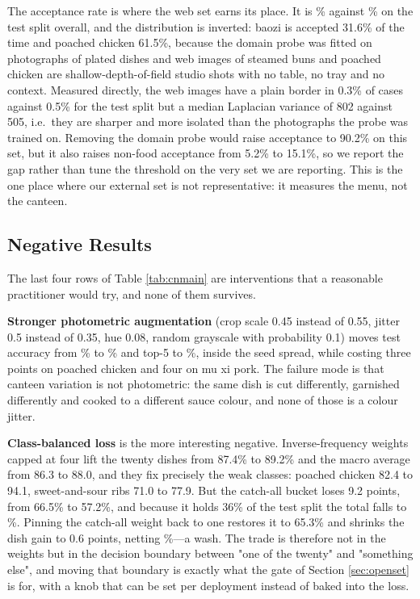 \documentclass[conference]{IEEEtran}
\begin{document}
The acceptance rate is where the web set earns its place. It is \webAccept\%
against \gateIn\% on the test split overall, and the distribution is inverted:
baozi is
accepted 31.6\% of the time and poached chicken 61.5\%, because the domain probe
was fitted on photographs of plated dishes and web images of steamed buns and
poached chicken are shallow-depth-of-field studio shots with no table, no tray
and no context. Measured directly, the web images have a plain border in 0.3\%
of cases against 0.5\% for the test split but a median Laplacian variance of 802
against 505, i.e.\ they are sharper and more isolated than the photographs the
probe was trained on. Removing the domain probe would raise acceptance to 90.2\%
on this set, but it also raises non-food acceptance from 5.2\% to 15.1\%, so we
report the gap rather than tune the threshold on the very set we are reporting.
This is the one place where our external set is not representative: it measures
the menu, not the canteen.

\subsection{Negative Results}
The last four rows of Table \ref{tab:cnmain} are interventions that a reasonable
practitioner would try, and none of them survives.

\textbf{Stronger photometric augmentation} (crop scale 0.45 instead of 0.55,
jitter 0.5 instead of 0.35, hue 0.08, random grayscale with probability 0.1)
moves test accuracy from \cnTest\% to \ablStrongTest\% and top-5 to
\ablStrongTopFive\%, inside the seed spread, while costing three points on
poached chicken and four on mu xi pork. The failure mode is that canteen
variation is not photometric: the same dish is cut differently, garnished
differently and cooked to a different sauce colour, and none of those is a
colour jitter.

\textbf{Class-balanced loss} is the more interesting negative. Inverse-frequency
weights capped at four lift the twenty dishes from 87.4\% to 89.2\% and the macro
average from 86.3 to 88.0, and they fix precisely the weak classes: poached
chicken 82.4 to 94.1, sweet-and-sour ribs 71.0 to 77.9. But the catch-all bucket
loses 9.2 points, from 66.5\% to 57.2\%, and because it holds 36\% of the test
split the total falls to \ablBalTest\%. Pinning the catch-all weight back to one
restores it to 65.3\% and shrinks the dish gain to 0.6 points, netting
\ablBalNoOtherTest\%---a wash. The trade is therefore not in the weights but in
the decision boundary between "one of the twenty" and "something else", and
moving that boundary is exactly what the gate of Section \ref{sec:openset} is
for, with a knob that can be set per deployment instead of baked into the loss.
\end{document}
